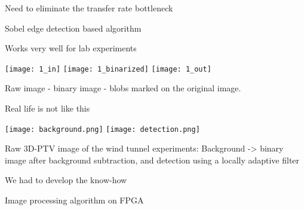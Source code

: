 \begin{frame}[label=real-6]{Need to eliminate the transfer rate bottleneck}
\begin{multicols*}{2}
%
\end{multicols*}
\end{frame}

\begin{frame}[label=real-7]{Sobel edge detection based algorithm}
\centering
{}
\end{frame}


\begin{frame}[label=real-8]{Works very well for lab experiments}
\begin{card}
\centering
\texttt{[image: 1\_in]}
\texttt{[image: 1\_binarized]}
\texttt{[image: 1\_out]}
\end{card}
\vspace{-.5cm}
\begin{cardTiny}
Raw image - binary image - blobs marked on the original image.  
\end{cardTiny}
\end{frame}


\begin{frame}[label=real-13]{Real life is not like this}
\begin{multicols}{2}
\texttt{[image: background.png]}
\texttt{[image: detection.png]}
\end{multicols}
\begin{cardTiny}
Raw 3D-PTV image of the wind tunnel experiments: Background ->  binary image after background subtraction, and detection using a locally adaptive filter
\end{cardTiny}
\end{frame}

\begin{frame}[label=real-12]{We had to develop the know-how}
\centering{}
\end{frame}


\begin{frame}[label=real-11]{Image processing algorithm on FPGA}
\centering{}
\end{frame}

